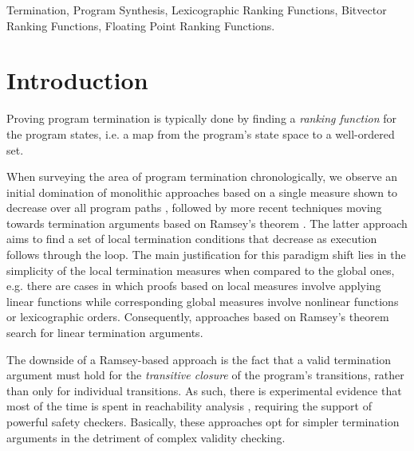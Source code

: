\documentclass[preprint]{sigplanconf}
\theoremstyle{definition}
\begin{document}
\keywords
Termination, Program Synthesis, Lexicographic Ranking Functions, Bitvector Ranking Functions,
Floating Point Ranking Functions.

\section{Introduction}\label{sec:intro}

Proving program termination is typically done by finding a \emph{ranking function}
for the program states, i.e. a map from the program's state space to a well-ordered set.

When surveying the area of program termination chronologically, we observe an initial domination of  monolithic approaches based on a single measure shown to decrease
over all program paths %
\cite{DBLP:conf/vmcai/P04,DBLP:conf/cav/BradleyMS05}, followed by 
more recent techniques moving towards termination arguments based on Ramsey's theorem \cite{DBLP:conf/lpe/CodishG03,DBLP:conf/lics/PodelskiR04,DBLP:conf/pldi/CookPR06}.
The latter approach aims to find a set of local termination conditions that decrease as execution follows through the loop. %
The main justification for this paradigm shift lies in the simplicity of the local termination measures when compared to the global ones, e.g.
there are cases in which proofs based on local measures involve applying linear functions while corresponding global
measures involve nonlinear functions or lexicographic orders. Consequently, approaches based on Ramsey's theorem 
search for linear termination arguments.


The downside of a Ramsey-based approach is the fact that a valid termination argument must hold for the \emph{transitive closure}
of the program's transitions, rather than only for individual transitions. 
As such, there is experimental evidence that most of the time is spent in reachability analysis \cite{DBLP:conf/pldi/CookPR06}, 
requiring the support of powerful safety checkers.
Basically, these approaches opt for simpler termination arguments in the detriment of complex validity checking.
\end{document}
